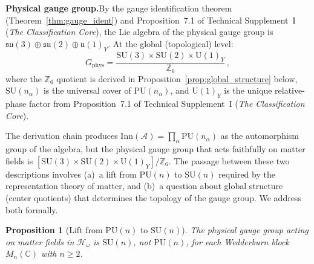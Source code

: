 \documentclass[11pt]{article}
\newtheorem{proposition}[theorem]{Proposition}
\theoremstyle{definition}
\newcommand{\SU}{\mathrm{SU}}
\newcommand{\U}{\mathrm{U}}
\newcommand{\TSI}{Technical Supplement~I (\emph{The Classification Core})}
\begin{document}
\noindent\textbf{Physical gauge group.}\quad By the gauge identification
theorem (Theorem~\ref{thm:gauge_ident}) and
Proposition~7.1 of \TSI{}, the Lie algebra of the physical gauge
group is $\mathfrak{su}(3) \oplus \mathfrak{su}(2) \oplus
\mathfrak{u}(1)_Y$.  At the global (topological) level:
\[
  G_{\mathrm{phys}} = \frac{\SU(3) \times \SU(2) \times \U(1)_Y}
  {\mathbb{Z}_6}\,,
\]
where the $\mathbb{Z}_6$ quotient is derived in
Proposition~\ref{prop:global_structure} below, $\SU(n_\alpha)$ is the
universal cover of $\mathrm{PU}(n_\alpha)$, and $\U(1)_Y$ is the
unique relative-phase factor from Proposition~7.1 of \TSI{}.

The derivation chain produces $\mathrm{Inn}(\mathcal{A}) = \prod_\alpha
\mathrm{PU}(n_\alpha)$ as the automorphism group of the algebra, but the
physical gauge group that acts faithfully on matter fields is
$[\SU(3) \times \SU(2) \times \U(1)_Y] / \mathbb{Z}_6$.  The passage between these two descriptions involves
(a)~a lift from $\mathrm{PU}(n)$ to $\SU(n)$ required by the
representation theory of matter, and (b)~a question about global
structure (center quotients) that determines the topology of the gauge
group.  We address both formally.

\begin{proposition}[Lift from $\mathrm{PU}(n)$ to $\SU(n)$]%
\label{prop:PU_to_SU}
The physical gauge group acting on matter fields in $\mathcal{H}_\omega$
is $\SU(n)$, not $\mathrm{PU}(n)$, for each Wedderburn block
$M_n(\mathbb{C})$ with $n \ge 2$.
\end{proposition}
\end{document}
